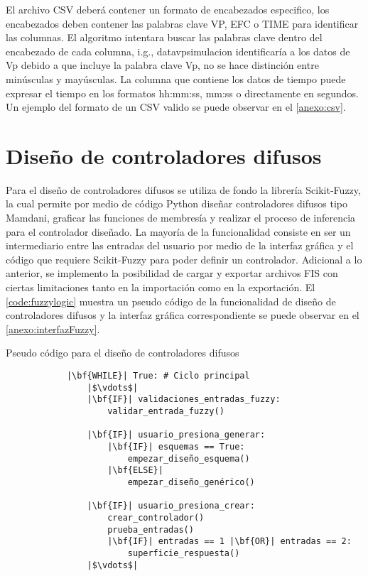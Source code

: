         El archivo CSV deberá contener un formato de encabezados especifico, los encabezados deben contener las palabras clave VP, EFC o TIME para identificar las columnas. El algoritmo intentara buscar las palabras clave dentro del encabezado de cada columna, i.g., datavpsimulacion identificaría a los datos de Vp debido a que incluye la palabra clave Vp, no se hace distinción entre minúsculas y mayúsculas. La columna que contiene los datos de tiempo puede expresar el tiempo en los formatos hh:mm:ss, mm:ss o directamente en segundos. Un ejemplo del formato de un CSV valido se puede observar en el \ref{anexo:csv}.

\section{Diseño de controladores difusos}
    
    Para el diseño de controladores difusos se utiliza de fondo la librería Scikit-Fuzzy, la cual permite por medio de código Python diseñar controladores difusos tipo Mamdani, graficar las funciones de membresía y realizar el proceso de inferencia para el controlador diseñado. La mayoría de la funcionalidad consiste en ser un intermediario entre las entradas del usuario por medio de la interfaz gráfica y el código que requiere Scikit-Fuzzy para poder definir un controlador. Adicional a lo anterior, se implemento la posibilidad de cargar y exportar archivos FIS con ciertas limitaciones tanto en la importación como en la exportación. El \cref{code:fuzzylogic} muestra un pseudo código de la funcionalidad de diseño de controladores difusos y la interfaz gráfica correspondiente se puede observar en el \ref{anexo:interfazFuzzy}.

    \begin{longlisting}
        \caption[Pseudo código - Diseño de controladores difusos]{Pseudo código para el diseño de controladores difusos}
        \label{code:fuzzylogic}				
        \begin{verbatim}
            |\bf{WHILE}| True: # Ciclo principal
                |$\vdots$|
                |\bf{IF}| validaciones_entradas_fuzzy:
                    validar_entrada_fuzzy()
                
                |\bf{IF}| usuario_presiona_generar:
                    |\bf{IF}| esquemas == True:
                        empezar_diseño_esquema()
                    |\bf{ELSE}|
                        empezar_diseño_genérico()
                
                |\bf{IF}| usuario_presiona_crear:
                    crear_controlador()
                    prueba_entradas()
                    |\bf{IF}| entradas == 1 |\bf{OR}| entradas == 2:
                        superficie_respuesta()
                |$\vdots$|
        \end{verbatim}
    \end{longlisting}
    
